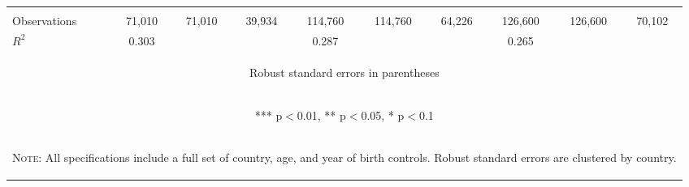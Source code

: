 \documentclass{article}[11pt,subeqn]
\begin{document}
\begin{spacing}{1.25}
\begin{sidewaystable}[!htbp]
\begin{center}
\begin{tabular}{lccccccccc}
\vspace{4pt} & \begin{footnotesize}\end{footnotesize} & \begin{footnotesize}\end{footnotesize} & \begin{footnotesize}\end{footnotesize} & \begin{footnotesize}\end{footnotesize} & \begin{footnotesize}\end{footnotesize} & \begin{footnotesize}\end{footnotesize} & \begin{footnotesize}\end{footnotesize} & \begin{footnotesize}\end{footnotesize} & \begin{footnotesize}\end{footnotesize} \\
Observations & 71,010 & 71,010 & 39,934 & 114,760 & 114,760 & 64,226 & 126,600 & 126,600 & 70,102 \\
 $R^2$ & 0.303 &  &  & 0.287 &  &  & 0.265 &  &  \\ \midrule
\multicolumn{10}{c}{\begin{footnotesize} Robust standard errors in parentheses\end{footnotesize}} \\
\multicolumn{10}{c}{\begin{footnotesize} *** p$<$0.01, ** p$<$0.05, * p$<$0.1\end{footnotesize}} \\
\bottomrule 
\multicolumn{10}{p{17.2cm}}{\setstretch{0.9}\begin{footnotesize}\textsc{Note:} All specifications include a full set of country, age, and year of birth controls. Robust standard errors are clustered by country.
\end{footnotesize}}\\
\end{tabular}
\end{center}
\end{sidewaystable}


\end{spacing}
\end{document}

